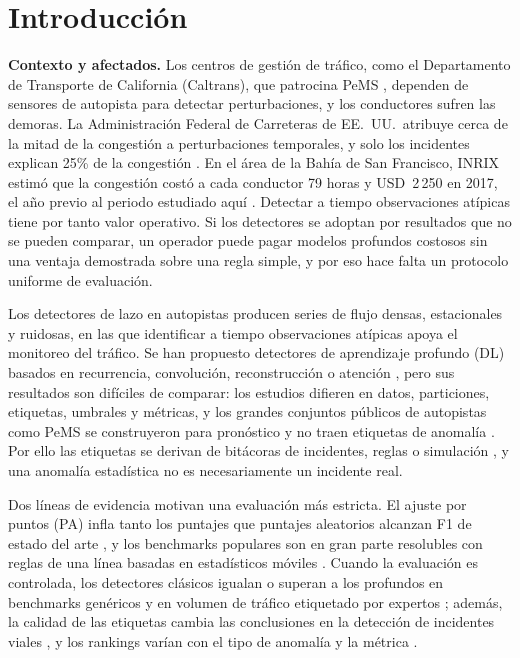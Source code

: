\documentclass[conference]{IEEEtran}
\begin{document}
\section{Introducci\'on}

\textbf{Contexto y afectados.} Los centros de gesti\'on de tr\'afico, como el
Departamento de Transporte de California (Caltrans), que patrocina PeMS
\cite{chen2003pems}, dependen de sensores de autopista para detectar
perturbaciones, y los conductores sufren las demoras. La Administraci\'on
Federal de Carreteras de EE.\ UU.\ atribuye cerca de la mitad de la
congesti\'on a perturbaciones temporales, y solo los incidentes explican 25\%
de la congesti\'on \cite{fhwa_nonrecurring}. En el \'area de la Bah\'ia de San
Francisco, INRIX estim\'o que la congesti\'on cost\'o a cada conductor 79 horas y
USD~2\,250 en 2017, el a\~no previo al periodo estudiado aqu\'i
\cite{cbs2018inrix}. Detectar a tiempo observaciones at\'ipicas tiene por tanto
valor operativo. Si los detectores se adoptan por resultados que no se pueden
comparar, un operador puede pagar modelos profundos costosos sin una ventaja
demostrada sobre una regla simple, y por eso hace falta un protocolo uniforme
de evaluaci\'on.

Los detectores de lazo en autopistas producen series de flujo densas,
estacionales y ruidosas, en las que identificar a tiempo observaciones
at\'ipicas apoya el monitoreo del tr\'afico. Se han propuesto detectores de
aprendizaje profundo (DL) basados en recurrencia, convoluci\'on,
reconstrucci\'on o atenci\'on
\cite{zhang2022automatic,mendez2022using,ijaradar2025datadriven,nouri2025sidmseq},
pero sus resultados son dif\'iciles de comparar: los estudios difieren en
datos, particiones, etiquetas, umbrales y m\'etricas, y los grandes conjuntos
p\'ublicos de autopistas como PeMS se construyeron para pron\'ostico y no
traen etiquetas de anomal\'ia \cite{coursey2024ftaed}. Por ello las etiquetas
se derivan de bit\'acoras de incidentes, reglas o simulaci\'on
\cite{sun2022datacentric,yang2025sumo}, y una anomal\'ia estad\'istica no es
necesariamente un incidente real.

Dos l\'ineas de evidencia motivan una evaluaci\'on m\'as estricta. El ajuste por
puntos (PA) infla tanto los puntajes que puntajes aleatorios alcanzan F1 de
estado del arte \cite{kim2022rigorous}, y los benchmarks populares son en
gran parte resolubles con reglas de una l\'inea basadas en estad\'isticos m\'oviles
\cite{wu2022flawed}. Cuando la evaluaci\'on es controlada, los detectores
cl\'asicos igualan o superan a los profundos en benchmarks gen\'ericos
\cite{schmidl2022anomaly,audibert2022deep,rewicki2023worth,liu2024elephant}
y en volumen de tr\'afico etiquetado por expertos
\cite{taheri2026applicability}; adem\'as, la calidad de las etiquetas cambia
las conclusiones en la detecci\'on de incidentes viales
\cite{sun2022datacentric}, y los rankings var\'ian con el tipo de anomal\'ia y
la m\'etrica \cite{liu2024elephant,sorbo2024navigating}.
\end{document}
